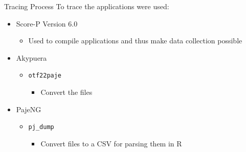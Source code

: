 \documentclass{beamer}
\begin{document}
\begin{frame}{Tracing Process}
To trace the applications were used:
\pause \vfill
    \begin{itemize}
        \item Score-P Version 6.0
        \begin{itemize}
            \item Used to compile applications and thus make data collection possible
        \end{itemize}
    \pause \vfill
        \item Akypuera
        \begin{itemize}
            \item \texttt{otf22paje}
                \begin{itemize}
                    \item Convert the files
                \end{itemize}
        \end{itemize}
    \pause \vfill
        \item PajeNG
        \begin{itemize}
            \item \texttt{pj\_dump}
                \begin{itemize}
                    \item Convert files to a CSV for parsing them in R
                \end{itemize}
        \end{itemize}
    \end{itemize}
\end{frame}
\end{document}
